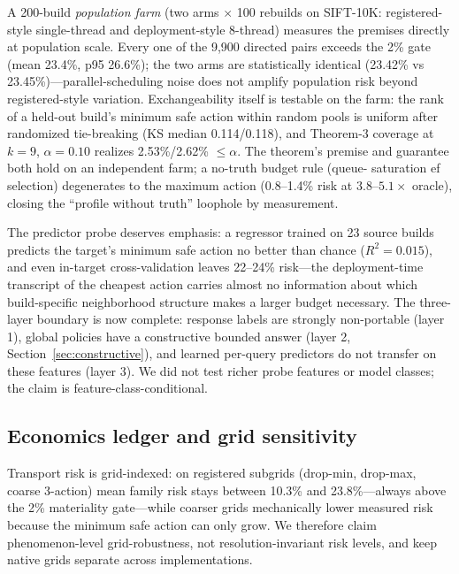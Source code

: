 \documentclass{article}
\begin{document}
A 200-build \emph{population farm} (two arms $\times$ 100 rebuilds on SIFT-10K: registered-style
single-thread and deployment-style 8-thread) measures the premises directly at population scale. Every one
of the 9{,}900 directed pairs exceeds the 2\% gate (mean 23.4\%, p95 26.6\%); the two arms are
statistically identical (23.42\% vs 23.45\%)---parallel-scheduling noise does not amplify population risk
beyond registered-style variation. Exchangeability itself is testable on the farm: the rank of a held-out
build's minimum safe action within random pools is uniform after randomized tie-breaking (KS median
0.114/0.118), and Theorem-3 coverage at $k{=}9$, $\alpha{=}0.10$ realizes 2.53\%/2.62\% $\le\alpha$.
The theorem's premise and guarantee both hold on an independent farm; a no-truth budget rule (queue-
saturation ef selection) degenerates to the maximum action (0.8--1.4\% risk at $3.8$--$5.1\times$ oracle),
closing the ``profile without truth'' loophole by measurement.

The predictor probe deserves emphasis: a regressor trained on 23 source builds predicts the target's
minimum safe action no better than chance ($R^2=0.015$), and even in-target cross-validation leaves
22--24\% risk---the deployment-time transcript of the cheapest action carries almost no information about
which build-specific neighborhood structure makes a larger budget necessary. The three-layer boundary is
now complete: response labels are strongly non-portable (layer 1), global policies have a constructive
bounded answer (layer 2, Section~\ref{sec:constructive}), and learned per-query predictors do not transfer
on these features (layer 3). We did not test richer probe features or model classes; the claim is
feature-class-conditional.

\subsection{Economics ledger and grid sensitivity}

Transport risk is grid-indexed: on registered subgrids (drop-min, drop-max, coarse 3-action) mean family
risk stays between 10.3\% and 23.8\%---always above the 2\% materiality gate---while coarser grids
mechanically lower measured risk because the minimum safe action can only grow. We therefore claim
phenomenon-level grid-robustness, not resolution-invariant risk levels, and keep native grids separate
across implementations.
\end{document}
